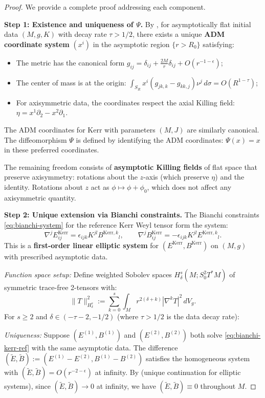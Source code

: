 \documentclass[12pt]{article}
\theoremstyle{plain}
\theoremstyle{definition}
\theoremstyle{remark}
\begin{document}
\begin{proof}
We provide a complete proof addressing each component.

\textbf{Step 1: Existence and uniqueness of $\Psi$.}
By \cite[Theorem~4.3]{chruscieldelay2003}, for asymptotically flat initial data $(M, g, K)$ with decay rate $\tau > 1/2$, there exists a unique \textbf{ADM coordinate system} $(x^i)$ in the asymptotic region $\{r > R_0\}$ satisfying:
\begin{itemize}
    \item The metric has the canonical form $g_{ij} = \delta_{ij} + \frac{2M}{r}\delta_{ij} + O(r^{-1-\epsilon})$;
    \item The center of mass is at the origin: $\int_{S_R} x^i(g_{jk,k} - g_{kk,j})\nu^j\,d\sigma = O(R^{1-\tau})$;
    \item For axisymmetric data, the coordinates respect the axial Killing field: $\eta = x^1\partial_2 - x^2\partial_1$.
\end{itemize}
The ADM coordinates for Kerr with parameters $(M, J)$ are similarly canonical. The diffeomorphism $\Psi$ is defined by identifying the ADM coordinates: $\Psi(x) = x$ in these preferred coordinates.

The remaining freedom consists of \textbf{asymptotic Killing fields} of flat space that preserve axisymmetry: rotations about the $z$-axis (which preserve $\eta$) and the identity. Rotations about $z$ act as $\phi \mapsto \phi + \phi_0$, which does not affect any axisymmetric quantity.

\textbf{Step 2: Unique extension via Bianchi constraints.}
The Bianchi constraints \eqref{eq:bianchi-system} for the reference Kerr Weyl tensor form the system:
\begin{equation}\label{eq:bianchi-kerr-ref}
\nabla^j E^{\mathrm{Kerr}}_{ij} = \epsilon_{ijk}K^{jl}B^{\mathrm{Kerr},k}{}_l, \qquad \nabla^j B^{\mathrm{Kerr}}_{ij} = -\epsilon_{ijk}K^{jl}E^{\mathrm{Kerr},k}{}_l.
\end{equation}
This is a \textbf{first-order linear elliptic system} for $(E^{\mathrm{Kerr}}, B^{\mathrm{Kerr}})$ on $(M, g)$ with prescribed asymptotic data.

\textit{Function space setup:} Define weighted Sobolev spaces $H^s_\delta(M; S^2_0 T^*M)$ of symmetric trace-free 2-tensors with:
\[
\|T\|_{H^s_\delta}^2 := \sum_{k=0}^{s} \int_M r^{2(\delta + k)}|\nabla^k T|^2\,dV_g.
\]
For $s \geq 2$ and $\delta \in (-\tau - 2, -1/2)$ (where $\tau > 1/2$ is the data decay rate):

\textit{Uniqueness:} Suppose $(E^{(1)}, B^{(1)})$ and $(E^{(2)}, B^{(2)})$ both solve \eqref{eq:bianchi-kerr-ref} with the same asymptotic data. The difference $(\tilde{E}, \tilde{B}) := (E^{(1)} - E^{(2)}, B^{(1)} - B^{(2)})$ satisfies the homogeneous system with $(\tilde{E}, \tilde{B}) = O(r^{-2-\epsilon})$ at infinity. By \cite[Theorem~5.1]{aronszajn1957} (unique continuation for elliptic systems), since $(\tilde{E}, \tilde{B}) \to 0$ at infinity, we have $(\tilde{E}, \tilde{B}) \equiv 0$ throughout $M$.


\end{proof}
\end{document}
